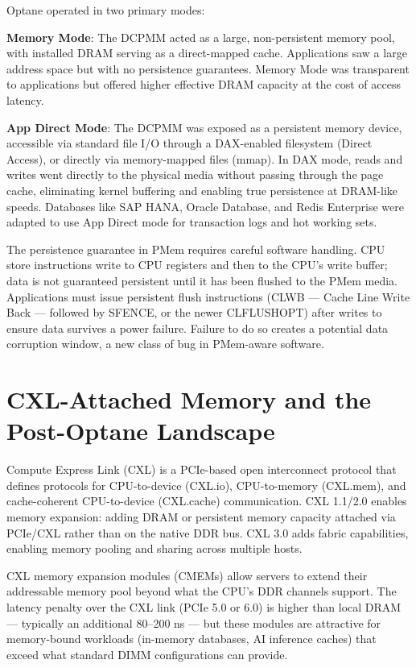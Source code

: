 Optane operated in two primary modes:

\textbf{Memory Mode}: The DCPMM acted as a large, non-persistent memory pool, with installed DRAM serving as a direct-mapped cache. Applications saw a large address space but with no persistence guarantees. Memory Mode was transparent to applications but offered higher effective DRAM capacity at the cost of access latency.

\textbf{App Direct Mode}: The DCPMM was exposed as a persistent memory device, accessible via standard file I/O through a DAX-enabled filesystem (Direct Access), or directly via memory-mapped files (mmap). In DAX mode, reads and writes went directly to the physical media without passing through the page cache, eliminating kernel buffering and enabling true persistence at DRAM-like speeds. Databases like SAP HANA, Oracle Database, and Redis Enterprise were adapted to use App Direct mode for transaction logs and hot working sets.

The persistence guarantee in PMem requires careful software handling. CPU store instructions write to CPU registers and then to the CPU's write buffer; data is not guaranteed persistent until it has been flushed to the PMem media. Applications must issue persistent flush instructions (CLWB --- Cache Line Write Back --- followed by SFENCE, or the newer CLFLUSHOPT) after writes to ensure data survives a power failure. Failure to do so creates a potential data corruption window, a new class of bug in PMem-aware software.

\section{CXL-Attached Memory and the Post-Optane Landscape}
Compute Express Link (CXL) is a PCIe-based open interconnect protocol that defines protocols for CPU-to-device (CXL.io), CPU-to-memory (CXL.mem), and cache-coherent CPU-to-device (CXL.cache) communication. CXL 1.1/2.0 enables memory expansion: adding DRAM or persistent memory capacity attached via PCIe/CXL rather than on the native DDR bus. CXL 3.0 adds fabric capabilities, enabling memory pooling and sharing across multiple hosts.

CXL memory expansion modules (CMEMs) allow servers to extend their addressable memory pool beyond what the CPU's DDR channels support. The latency penalty over the CXL link (PCIe 5.0 or 6.0) is higher than local DRAM --- typically an additional 80--200 ns --- but these modules are attractive for memory-bound workloads (in-memory databases, AI inference caches) that exceed what standard DIMM configurations can provide.

